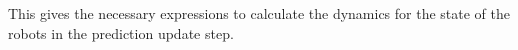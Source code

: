 %
%
This gives the necessary expressions to calculate the dynamics for the state of the robots in the prediction update step.

